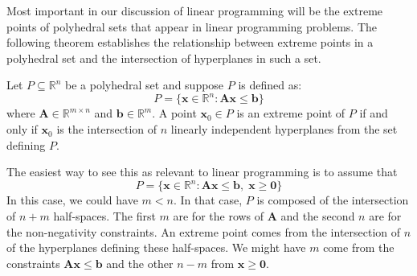 Most important in our discussion of linear programming will be the extreme points of polyhedral sets that appear in linear programming problems. The following theorem establishes the relationship between extreme points in a polyhedral set and the intersection of hyperplanes in such a set.

\begin{theorem} Let $P \subseteq \mathbb{R}^n$ be a polyhedral set and suppose $P$ is defined as:
\begin{equation}
P = \{\mathbf{x} \in \mathbb{R}^n : \mathbf{A}\mathbf{x} \leq \mathbf{b}\}
\end{equation}
where $\mathbf{A} \in \mathbb{R}^{m \times n}$ and $\mathbf{b} \in \mathbb{R}^m$. A point $\mathbf{x}_0 \in P$ is an extreme point of $P$ if and only if $\mathbf{x}_0$ is the intersection of $n$ linearly independent hyperplanes from the set defining $P$. 
\label{thm:DefExtremePoint}
\end{theorem}

\begin{remark}The easiest way to see this as relevant to linear programming is to assume that 
\begin{equation}
P = \{\mathbf{x} \in \mathbb{R}^n : \mathbf{A}\mathbf{x} \leq \mathbf{b},\;\mathbf{x} \geq \mathbf{0}\}
\end{equation}
In this case, we could have $m < n$. In that case, $P$ is composed of the intersection of $n + m$ half-spaces. The first $m$ are for the rows of $\mathbf{A}$ and the second $n$ are for the non-negativity constraints. An extreme point comes from the intersection of $n$ of the hyperplanes defining these half-spaces. We  might have $m$ come from the constraints $\mathbf{A}\mathbf{x} \leq \mathbf{b}$ and the other $n-m$ from $\mathbf{x} \geq \mathbf{0}$.
\end{remark}

